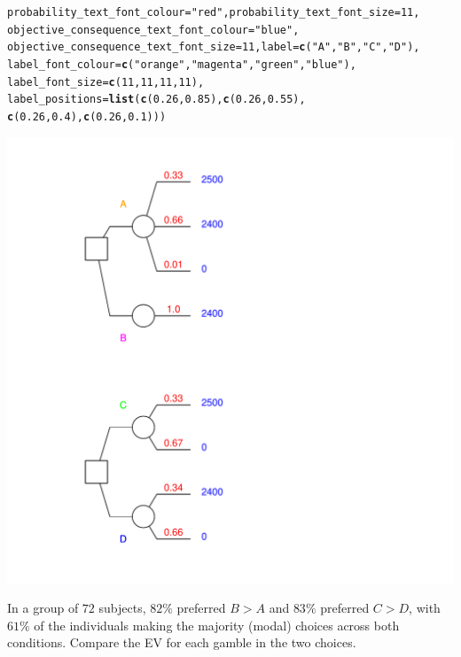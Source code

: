 \documentclass{article}\usepackage[]{graphicx}\usepackage[]{color}
\makeatletter
\newcommand{\hlnum}[1]{\textcolor[rgb]{0.686,0.059,0.569}{#1}}%
\newcommand{\hlstr}[1]{\textcolor[rgb]{0.192,0.494,0.8}{#1}}%
\newcommand{\hlstd}[1]{\textcolor[rgb]{0.345,0.345,0.345}{#1}}%
\newcommand{\hlkwc}[1]{\textcolor[rgb]{0.333,0.667,0.333}{#1}}%
\newcommand{\hlkwd}[1]{\textcolor[rgb]{0.737,0.353,0.396}{\textbf{#1}}}%
\newenvironment{kframe}{%
 \def\at@end@of@kframe{}%
 \ifinner\ifhmode%
  \def\at@end@of@kframe{\end{minipage}}%
  \begin{minipage}{\columnwidth}%
 \fi\fi%
 \def\FrameCommand##1{\hskip\@totalleftmargin \hskip-\fboxsep
 \colorbox{shadecolor}{##1}\hskip-\fboxsep
     \hskip-\linewidth \hskip-\@totalleftmargin \hskip\columnwidth}%
 \MakeFramed {\advance\hsize-\width
   \@totalleftmargin\z@ \linewidth\hsize
   \@setminipage}}%
 {\par\unskip\endMakeFramed%
 \at@end@of@kframe}
\newenvironment{knitrout}{}{} %
\makeatother
\begin{document}
\begin{knitrout}
\begin{kframe}
\begin{alltt}
        \hlkwc{probability_text_font_colour}\hlstd{=}\hlstr{"red"}\hlstd{,} \hlkwc{probability_text_font_size}\hlstd{=}\hlnum{11}\hlstd{,}
        \hlkwc{objective_consequence_text_font_colour}\hlstd{=}\hlstr{"blue"}\hlstd{,}
        \hlkwc{objective_consequence_text_font_size}\hlstd{=}\hlnum{11}\hlstd{,} \hlkwc{label}\hlstd{=}\hlkwd{c}\hlstd{(}\hlstr{"A"}\hlstd{,}\hlstr{"B"}\hlstd{,}\hlstr{"C"}\hlstd{,} \hlstr{"D"}\hlstd{),}
        \hlkwc{label_font_colour}\hlstd{=}\hlkwd{c}\hlstd{(}\hlstr{"orange"}\hlstd{,}\hlstr{"magenta"}\hlstd{,}\hlstr{"green"}\hlstd{,}\hlstr{"blue"}\hlstd{),}
        \hlkwc{label_font_size}\hlstd{=}\hlkwd{c}\hlstd{(}\hlnum{11}\hlstd{,}\hlnum{11}\hlstd{,}\hlnum{11}\hlstd{,}\hlnum{11}\hlstd{),}
        \hlkwc{label_positions}\hlstd{=}\hlkwd{list}\hlstd{(}\hlkwd{c}\hlstd{(}\hlnum{0.26}\hlstd{,}\hlnum{0.85}\hlstd{),}\hlkwd{c}\hlstd{(}\hlnum{0.26}\hlstd{,}\hlnum{0.55}\hlstd{),}
                \hlkwd{c}\hlstd{(}\hlnum{0.26}\hlstd{,}\hlnum{0.4}\hlstd{),}\hlkwd{c}\hlstd{(}\hlnum{0.26}\hlstd{,}\hlnum{0.1}\hlstd{)))}
\end{alltt}
\end{kframe}

{\centering \includegraphics[width=0.8\linewidth]{figure/unnamed-chunk-2} 

}



\end{knitrout}


In a group of $72$ subjects, $82\%$ preferred $B > A$ and $83\%$ preferred $C > D$, with $61\%$ of the individuals
making the majority (modal) choices across both conditions. Compare the EV for each gamble in the two choices.
\end{document}
